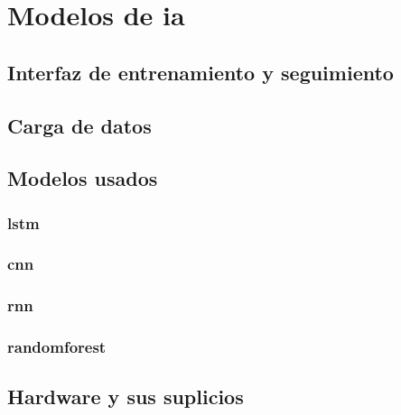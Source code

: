 \section{Modelos de \gls{ia}}

\subsection{Interfaz de entrenamiento y seguimiento}
\subsection{Carga de datos}
\subsection{Modelos usados}
\subsubsection{\gls{lstm}}
\subsubsection{\gls{cnn}}
\subsubsection{\gls{rnn}}
\subsubsection{\gls{randomforest}}
\subsection{Hardware y sus suplicios}